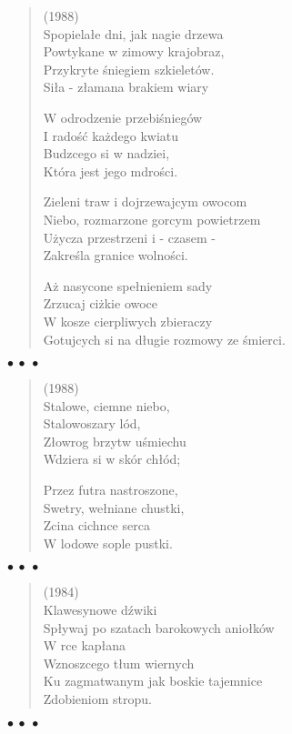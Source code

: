 \documentclass{article} %
\newenvironment{wierszd}[2]
	{\begin{verse} \hspace*{-1em}{\bf #1}\hfill{\small{(#2)}}\\[.5ex] }
	{\end{verse} \begin{center}$\bullet\ \bullet\ \bullet$\end{center}}
\newcommand{\e}{\eob}
\renewcommand{\a}{\aob}
\renewcommand{\o}{\'{o}}
\newcommand{\z}{\'{z}}
\newcommand{\s}{\'{s}}
\newcommand{\ci}{\'{c}}
\begin{document}
\begin{wierszd} {Pory roku}{1988}
Spopiela{\l}e dni, jak nagie drzewa \\ 
Powtykane w zimowy krajobraz, \\ 
Przykryte {\s}niegiem szkielet{\o}w. \\ 
Si{\l}a - z{\l}amana brakiem wiary  

W odrodzenie przebi{\s}nieg{\o}w \\ 
I rado{\s}{\ci} ka\.{z}dego kwiatu \\ 
Budz{\a}cego si{\e} w nadziei, \\ 
Kt{\o}ra jest jego m{\a}dro{\s}ci{\a}. 

Zieleni traw i dojrzewaj{\a}cym owocom \\ 
Niebo, rozmarzone gor{\a}cym powietrzem \\ 
U\.{z}ycza przestrzeni i - czasem - \\ 
Zakre{\s}la granice wolno{\s}ci.  

A\.{z} nasycone spe{\l}nieniem sady \\ 
Zrzucaj{\a} ci{\e}\.{z}kie owoce \\ 
W kosze cierpliwych zbieraczy \\ 
Gotuj{\a}cych si{\e} na d{\l}ugie rozmowy ze {\s}mierci{\a}.

\end{wierszd}

\newpage
\begin{wierszd}{Spacer zimowy}{1988}
Stalowe, ciemne niebo, \\ 
Stalowoszary l{\o}d, \\ 
Z{\l}owrog{\a} brzytw{\a} u{\s}miechu \\ 
Wdziera si{\e} w sk{\o}r{\e} ch{\l}{\o}d;

Przez futra nastroszone, \\ 
Swetry, we{\l}niane chustki, \\ 
Zcina cichn{\a}ce serca \\ 
W lodowe sople pustki.

\end{wierszd}

\begin{wierszd} 
{Msza barokowa} {1984}
Klawesynowe d{\z}wi{\e}ki \\ 
Sp{\l}ywaj{\a} po szatach barokowych anio{\l}k{\o}w \\ 
W r{\e}ce kap{\l}ana \\ 
Wznosz{\a}cego t{\l}um wiernych \\ 
Ku zagmatwanym jak boskie tajemnice \\ 
Zdobieniom stropu.

\end{wierszd}
\end{document}
